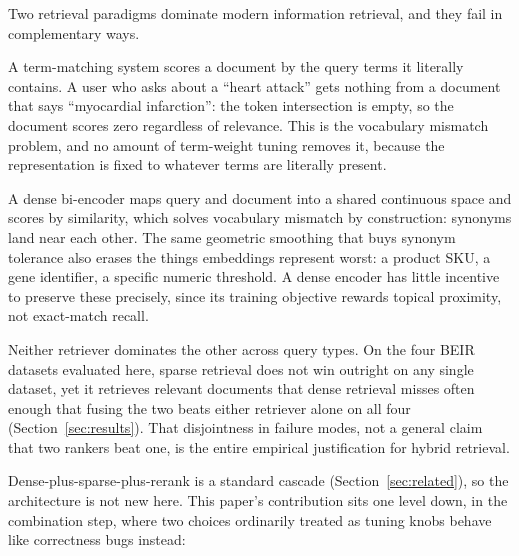 \documentclass[11pt]{article}
\begin{document}
Two retrieval paradigms dominate modern information retrieval, and they fail in complementary ways.

A term-matching system scores a document by the query terms it literally contains. A user who asks about a ``heart attack'' gets nothing from a document that says ``myocardial infarction'': the token intersection is empty, so the document scores zero regardless of relevance. This is the vocabulary mismatch problem, and no amount of term-weight tuning removes it, because the representation is fixed to whatever terms are literally present.

A dense bi-encoder maps query and document into a shared continuous space and scores by similarity, which solves vocabulary mismatch by construction: synonyms land near each other. The same geometric smoothing that buys synonym tolerance also erases the things embeddings represent worst: a product SKU, a gene identifier, a specific numeric threshold. A dense encoder has little incentive to preserve these precisely, since its training objective rewards topical proximity, not exact-match recall.

Neither retriever dominates the other across query types. On the four BEIR datasets evaluated here, sparse retrieval does not win outright on any single dataset, yet it retrieves relevant documents that dense retrieval misses often enough that fusing the two beats either retriever alone on all four (Section~\ref{sec:results}). That disjointness in failure modes, not a general claim that two rankers beat one, is the entire empirical justification for hybrid retrieval.

Dense-plus-sparse-plus-rerank is a standard cascade (Section~\ref{sec:related}), so the architecture is not new here. This paper's contribution sits one level down, in the combination step, where two choices ordinarily treated as tuning knobs behave like correctness bugs instead:
\end{document}
